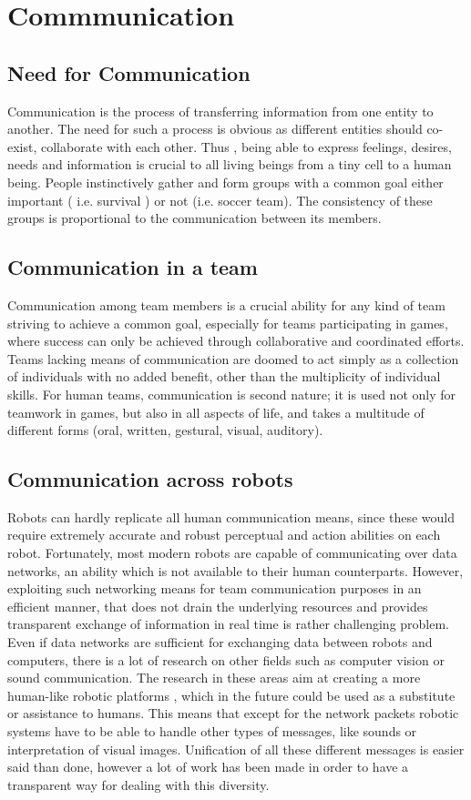 \chapter{Commmunication}
\label{communication}

\section{Need for Communication}
Communication is the process of transferring information from one entity to another. The need for such a process is obvious as different entities should co-exist, collaborate with each other. Thus , being able to express feelings, desires, needs and information is crucial to all living beings from a tiny cell to a human being. People instinctively gather and form groups with a common goal either important ( i.e. survival ) or not (i.e. soccer team).
The consistency of these groups is proportional to the communication between its members.

\section{Communication in a team }
Communication among team members is a crucial ability for any kind of team striving to achieve a common goal, especially for teams participating in games, where success can only be achieved through collaborative and coordinated efforts. Teams lacking means of communication are doomed to act simply as a collection of individuals with no added benefit, other than the multiplicity of individual skills. For human teams, communication is second nature; it is used not only for teamwork in games, but also in all aspects of life, and takes a multitude of different forms (oral, written, gestural, visual, auditory). 

\section{Communication across robots}
Robots can hardly replicate all human communication means, since these would require extremely accurate and robust perceptual and action abilities on each robot. Fortunately, most modern robots are capable of communicating over data networks, an ability which is not available to their human counterparts. However, exploiting such networking means for team communication purposes in an efficient manner, that does not drain the underlying resources and provides transparent exchange of information in real time is rather challenging problem. Even if data networks are sufficient for exchanging data between robots and computers, there is a lot of research on other fields such as computer vision or sound communication. The research in these areas aim at creating a more human-like robotic platforms , which in the future could be used as a substitute or assistance to humans. This means that except for the network packets robotic systems have to be able to handle other types of messages, like sounds or interpretation of visual images. Unification of all these different messages is easier said than done, however a lot of work has been made in order to have a transparent way for dealing with this diversity.
